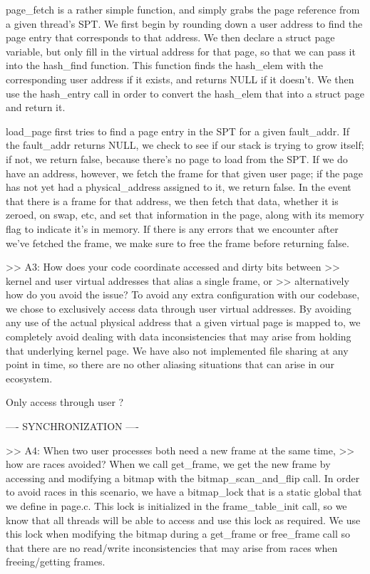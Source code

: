 page_fetch is a rather simple function, and simply grabs the page reference from a given 
thread's SPT. We first begin by rounding down a user address to find the page entry that
corresponds to that address. We then declare a struct page variable, but only fill in the
virtual address for that page, so that we can pass it into the hash_find function. This 
function finds the hash_elem with the corresponding user address if it exists, and returns 
NULL if it doesn't. We then use the hash_entry call in order to convert the hash_elem that 
into a struct page and return it.

load_page first tries to find a page entry in the SPT for a given fault_addr. If the 
fault_addr returns NULL, we check to see if our stack is trying to grow itself; if not,
we return false, because there's no page to load from the SPT. If we do have an address,
however, we fetch the frame for that given user page; if the page has not yet had a 
physical_address assigned to it, we return false. In the event that there is a frame 
for that address, we then fetch that data, whether it is zeroed, on swap, etc, and set
that information in the page, along with its memory flag to indicate it's in memory. If 
there is any errors that we encounter after we've fetched the frame, we make sure to free
the frame before returning false.

>> A3: How does your code coordinate accessed and dirty bits between
>> kernel and user virtual addresses that alias a single frame, or
>> alternatively how do you avoid the issue?
To avoid any extra configuration with our codebase, we chose to exclusively access data 
through user virtual addresses. By avoiding any use of the actual physical address that
a given virtual page is mapped to, we completely avoid dealing with data inconsistencies
that may arise from holding that underlying kernel page. We have also not implemented
file sharing at any point in time, so there are no other aliasing situations that can
arise in our ecosystem.

Only access through user ?

---- SYNCHRONIZATION ----

>> A4: When two user processes both need a new frame at the same time,
>> how are races avoided?
When we call get_frame, we get the new frame by accessing and modifying a bitmap with the
bitmap_scan_and_flip call. In order to avoid races in this scenario, we have a bitmap_lock 
that is a static global that we define in page.c. This lock is initialized in the 
frame_table_init call, so we know that all threads will be able to access and use this lock
as required. We use this lock when modifying the bitmap during a get_frame or free_frame
call so that there are no read/write inconsistencies that may arise from races when 
freeing/getting frames.

